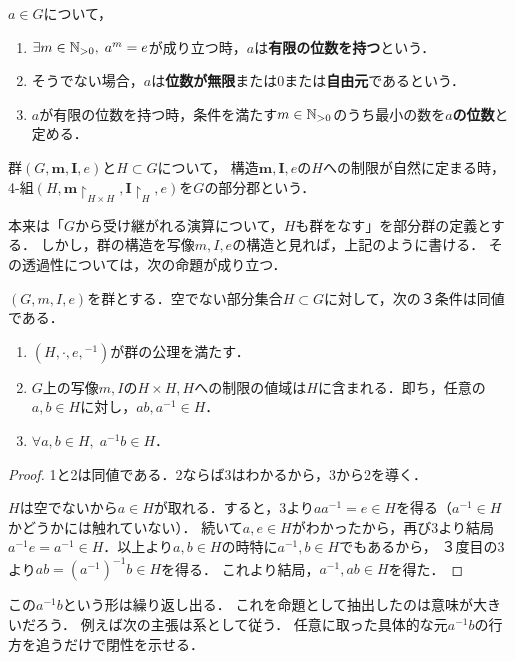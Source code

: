 \documentclass[uplatex,dvipdfmx]{jsreport}
\begin{document}
\begin{definition}[元の位数]
    $a\in G$について，
    \begin{enumerate}
        \item $\exists m\in\mathbb{N}_{>0},\; a^m=e$が成り立つ時，$a$は\textbf{有限の位数を持つ}という．
        \item そうでない場合，$a$は\textbf{位数が無限}または$0$または\textbf{自由元}であるという．
        \item $a$が有限の位数を持つ時，条件を満たす$m\in\mathbb{N}_{>0}$のうち最小の数を\textbf{$a$の位数}と定める．
    \end{enumerate}
\end{definition}

\begin{definition}[subgroup]
    群$(G,\mathbf{m},\mathbf{I},e)$と$H\subset G$について，
    構造$\mathbf{m,I},e$の$H$への制限が自然に定まる時，
    4-組$(H,\mathbf{m}\restriction_{H\times H},\mathbf{I}\restriction_H,e)$を$G$の部分郡という．
\end{definition}
\begin{remark}
    本来は「$G$から受け継がれる演算について，$H$も群をなす」を部分群の定義とする．
    しかし，群の構造を写像$m,I,e$の構造と見れば，上記のように書ける．
    その透過性については，次の命題が成り立つ．
\end{remark}

\begin{proposition}[群の公理の集合論的特徴付け]\label{prop-characterization-of-groups}
    $(G,m,I,e)$を群とする．空でない部分集合$H\subset G$に対して，次の３条件は同値である．
    \begin{enumerate}
        \item $(H,\cdot,e,{}^{-1})$が群の公理を満たす．
        \item $G$上の写像$m,I$の$H\times H,H$への制限の値域は$H$に含まれる．即ち，任意の$a,b\in H$に対し，$ab,a^{-1}\in H$．
        \item $\forall a,b\in H,\; a^{-1}b\in H$．
    \end{enumerate}
\end{proposition}
\begin{proof}
    1と2は同値である．2ならば3はわかるから，3から2を導く．

    $H$は空でないから$a\in H$が取れる．すると，3より$aa^{-1}=e\in H$を得る（$a^{-1}\in H$かどうかには触れていない）．
    続いて$a,e\in H$がわかったから，再び3より結局$a^{-1}e=a^{-1}\in H$．以上より$a,b\in H$の時特に$a^{-1},b\in H$でもあるから，
    ３度目の3より$ab=(a^{-1})^{-1}b\in H$を得る．
    これより結局，$a^{-1},ab\in H$を得た．
\end{proof}
\begin{remark}
    この$a^{-1}b$という形は繰り返し出る．
    これを命題として抽出したのは意味が大きいだろう．
    例えば次の主張は系として従う．
    任意に取った具体的な元$a^{-1}b$の行方を追うだけで閉性を示せる．
\end{remark}
\end{document}
